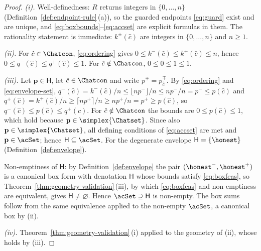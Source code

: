 \begin{proof}
\emph{(i).} Well-definedness: $R$ returns integers in $\{0,\dots,n\}$
(Definition~\ref{def:endpoint-rule}\,(a)), so the guarded endpoints
\eqref{eq:guard} exist and are unique, and
\eqref{eq:boxbounds}--\eqref{eq:accset} are explicit formulas in them. The
rationality statement is immediate: $k^{\pm}(\hat c)$ are integers in
$\{0,\dots,n\}$ and $n\ge1$.

\emph{(ii).} For $\hat c\in\Chatcon$, \eqref{eq:ordering} gives $0\le
k^{-}(\hat c)\le k^{+}(\hat c)\le n$, hence $0\le q^{-}(\hat c)\le q^{+}(\hat
c)\le1$. For $\hat c\notin\Chatcon$, $0\le0\le1\le1$.

\emph{(iii).} Let $\mathbf{p}\in\mathsf{H}$, let $\hat c\in\Chatcon$ and
write $p^{\mp}=p^{\mp}_{\hat c}$. By \eqref{eq:ordering} and
\eqref{eq:envelope-set},
$q^{-}(\hat c)=k^{-}(\hat c)/n\le\lfloor np^{-}\rfloor/n\le np^{-}/n=p^{-}
\le p(\hat c)$ and
$q^{+}(\hat c)=k^{+}(\hat c)/n\ge\lceil np^{+}\rceil/n\ge np^{+}/n=p^{+}
\ge p(\hat c)$, so $q^{-}(\hat c)\le p(\hat c)\le q^{+}(\hat c)$. For
$\hat c\notin\Chatcon$ the bounds are $0\le p(\hat c)\le1$, which hold because
$\mathbf{p}\in\simplex{\Chatset}$. Since also
$\mathbf{p}\in\simplex{\Chatset}$, all defining conditions of
\eqref{eq:accset} are met and $\mathbf{p}\in\acSet$; hence
$\mathsf{H}\subseteq\acSet$. For the degenerate envelope
$\mathsf{H}=\{\honest\}$ (Definition~\ref{def:envelope}).

Non-emptiness of $\mathsf{H}$: by Definition~\ref{def:envelope} the pair
$({\honest}^{-},{\honest}^{+})$ is a canonical box form with denotation
$\mathsf{H}$ whose bounds satisfy \eqref{eq:boxfeas}, so
Theorem~\ref{thm:geometry-validation}\,(iii), by which \eqref{eq:boxfeas} and
non-emptiness are equivalent, gives $\mathsf{H}\neq\varnothing$.
Hence $\acSet\supseteq\mathsf{H}$ is non-empty. The box sums follow from the
same equivalence applied to the non-empty $\acSet$, a canonical box by (ii).

\emph{(iv).} Theorem~\ref{thm:geometry-validation}\,(i) applied to the geometry of (ii),
whose  holds by (iii).
\end{proof}
